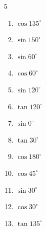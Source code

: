 \begin{multicols}{5}
\begin{enumerate}
  \item $\displaystyle \cos{135^\circ}$


  \item $\displaystyle \sin{150^\circ}$


  \item $\displaystyle \sin{60^\circ}$


  \item $\displaystyle \cos{60^\circ}$


  \item $\displaystyle \sin{120^\circ}$


  \item $\displaystyle \tan{120^\circ}$


  \item $\displaystyle \sin{0^\circ}$

        \phantom{$\displaystyle =0$}

  \item $\displaystyle \tan{30^\circ}$


  \item $\displaystyle \cos{180^\circ}$

        \phantom{$\displaystyle =-1$}

  \item $\displaystyle \cos{45^\circ}$


  \item $\displaystyle \sin{30^\circ}$


  \item $\displaystyle \cos{30^\circ}$


  \item $\displaystyle \tan{135^\circ}$


\end{enumerate}
\end{multicols}
